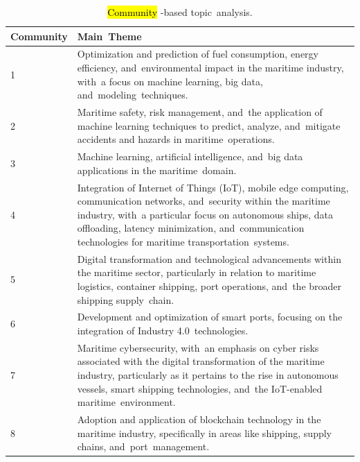 \documentclass[jmse,review,accept,pdftex,moreauthors]{Definitions/mdpi}
\begin{document}
\begin{table}[H]

	\caption{\hl{Community}%
-based topic~analysis.}
	\begin{tabularx}{\linewidth}{p{2cm}X}
		\toprule
		\textbf{Community} & \textbf{Main~Theme} \\
		\midrule
		1 & Optimization and prediction of fuel consumption, energy efficiency, and~environmental impact in the maritime industry, with~a focus on machine learning, big data, and~modeling~techniques.\\
		2 & Maritime safety, risk management, and~the application of machine learning techniques to predict, analyze, and~mitigate accidents and hazards in maritime~operations. \\
		3 & Machine learning, artificial intelligence, and~big data applications in the maritime~domain.\\
		4 & Integration of Internet of Things (IoT), mobile edge computing, communication networks, and~security within the maritime industry, with~a particular focus on autonomous ships, data offloading, latency minimization, and~communication technologies for maritime transportation~systems.\\
		5 & Digital transformation and technological advancements within the maritime sector, particularly in relation to maritime logistics, container shipping, port operations, and~the broader shipping supply~chain.\\
		6 & Development and optimization of smart ports, focusing on the integration of Industry 4.0~technologies.\\
		7 & Maritime cybersecurity, with~an emphasis on cyber risks associated with the digital transformation of the maritime industry, particularly as it pertains to the rise in autonomous vessels, smart shipping technologies, and~the IoT-enabled maritime~environment.\\
		8 & Adoption and application of blockchain technology in the maritime industry, specifically in areas like shipping, supply chains, and~port~management.\\
		\bottomrule
	\end{tabularx}
	\label{tab:citationthemes}
\end{table}
\end{document}
